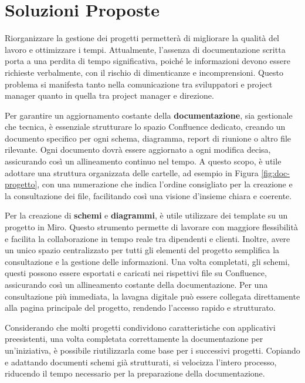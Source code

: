 \section{Soluzioni Proposte}
Riorganizzare la gestione dei progetti permetterà di migliorare la qualità
del lavoro e ottimizzare i tempi. Attualmente, l'assenza di documentazione scritta porta a una perdita di tempo significativa, poiché
le informazioni devono essere richieste verbalmente, con il rischio di dimenticanze e incomprensioni. Questo problema si manifesta tanto
nella comunicazione tra sviluppatori e project manager quanto in quella tra project manager e direzione.

Per garantire un aggiornamento costante della \textbf{documentazione}, sia gestionale che tecnica, è essenziale strutturare lo spazio Confluence dedicato,
creando un documento specifico per ogni schema, diagramma, report di riunione o altro file rilevante. Ogni documento dovrà essere aggiornato a ogni
modifica decisa, assicurando così un allineamento continuo nel tempo. A questo scopo, è utile adottare una struttura organizzata delle cartelle,
ad esempio in Figura \ref{fig:doc-progetto},
con una numerazione che indica l’ordine consigliato per la creazione e la consultazione dei file, facilitando così una visione d’insieme
chiara e coerente.

Per la creazione di \textbf{schemi} e \textbf{diagrammi}, è utile utilizzare dei template su un progetto in Miro. Questo strumento permette di
lavorare con maggiore flessibilità e facilita la collaborazione in tempo reale tra dipendenti e clienti. Inoltre, avere un unico spazio
centralizzato per tutti gli elementi del progetto semplifica la consultazione e la gestione delle informazioni. Una volta completati,
gli schemi, questi possono essere esportati e caricati nei rispettivi file su Confluence, assicurando così un allineamento costante della
documentazione. Per una consultazione più immediata, la lavagna digitale può essere collegata direttamente alla pagina principale del progetto,
rendendo l’accesso rapido e strutturato.

Considerando che molti progetti condividono caratteristiche con applicativi preesistenti, una volta completata correttamente la
documentazione per un’iniziativa, è possibile riutilizzarla come base per i successivi progetti. Copiando e adattando documenti 
schemi già strutturati, si velocizza l’intero processo, riducendo il tempo necessario per la preparazione della documentazione.

